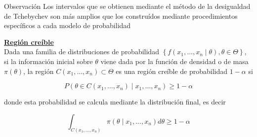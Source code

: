 \begin{observación}
Observación Los intervalos que se obtienen mediante el método de la desigualdad de Tchebychev son más amplios que los construídos mediante procedimientos específicos a cada modelo de probabilidad
\end{observación}

\underline{\textbf{Región creíble}}\\
Dada una familia de distribuciones de probabilidad $\left\{f\left(x_{1}, \ldots, x_{n} \mid \theta\right), \theta \in \Theta\right\}$, si la información inicial sobre $\theta$ viene dada por la función de densidad o de masa $\pi(\theta)$, la región $C\left(x_{1}, \ldots, x_{n}\right) \subset \Theta$ es una región creíble de probabilidad $1-\alpha$ si

$$
P\left(\theta \in C\left(x_{1}, \ldots, x_{n}\right) \mid x_{1}, \ldots, x_{n}\right) \geq 1-\alpha
$$

donde esta probabilidad se calcula mediante la distribución final, es decir

$$
\int_{C\left(x_{1}, \ldots, x_{n}\right)} \pi\left(\theta \mid x_{1}, \ldots, x_{n}\right) d \theta \geq 1-\alpha
$$


